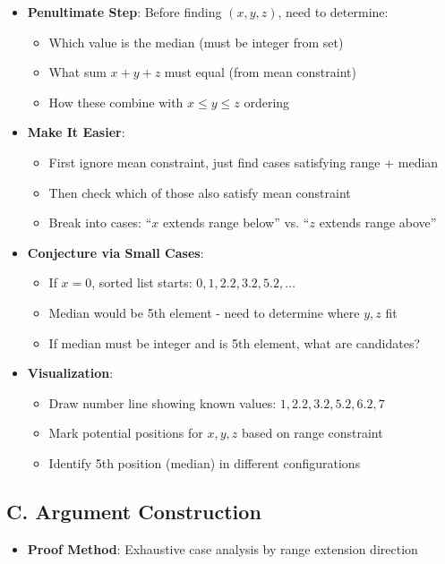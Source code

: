 \documentclass[11pt]{article}
\begin{document}
\begin{strategicbox}
\begin{itemize}[leftmargin=*]
    \item \textbf{Penultimate Step}: Before finding $(x, y, z)$, need to determine:
    \begin{itemize}
        \item Which value is the median (must be integer from set)
        \item What sum $x + y + z$ must equal (from mean constraint)
        \item How these combine with $x \leq y \leq z$ ordering
    \end{itemize}
    
    \item \textbf{Make It Easier}: 
    \begin{itemize}
        \item First ignore mean constraint, just find cases satisfying range + median
        \item Then check which of those also satisfy mean constraint
        \item Break into cases: ``$x$ extends range below'' vs. ``$z$ extends range above''
    \end{itemize}
    
    \item \textbf{Conjecture via Small Cases}: 
    \begin{itemize}
        \item If $x = 0$, sorted list starts: $0, 1, 2.2, 3.2, 5.2, \ldots$
        \item Median would be 5th element - need to determine where $y, z$ fit
        \item If median must be integer and is 5th element, what are candidates?
    \end{itemize}
    
    \item \textbf{Visualization}: 
    \begin{itemize}
        \item Draw number line showing known values: $1, 2.2, 3.2, 5.2, 6.2, 7$
        \item Mark potential positions for $x, y, z$ based on range constraint
        \item Identify 5th position (median) in different configurations
    \end{itemize}
\end{itemize}

\subsection*{C. Argument Construction}
\begin{itemize}[leftmargin=*]
    \item \textbf{Proof Method}: Exhaustive case analysis by range extension direction
    

\end{itemize}
\end{strategicbox}
\end{document}
